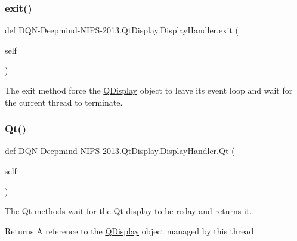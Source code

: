 \subsubsection{\texorpdfstring{exit()}{exit()}}
{\footnotesize\ttfamily def D\+QN-\/Deepmind-\/N\+I\+PS-\/2013.Qt\+Display.\+Display\+Handler.\+exit (\begin{DoxyParamCaption}\item[{}]{self }\end{DoxyParamCaption})}



The exit method force the \hyperlink{classDQN-Deepmind-NIPS-2013_1_1QtDisplay_1_1QDisplay}{Q\+Display} object to leave its event loop and wait for the current thread to terminate. 

\hypertarget{classDQN-Deepmind-NIPS-2013_1_1QtDisplay_1_1DisplayHandler_a1c18d34e62cbeff7c6d75a8eeb02506b}{}\label{classDQN-Deepmind-NIPS-2013_1_1QtDisplay_1_1DisplayHandler_a1c18d34e62cbeff7c6d75a8eeb02506b} 
\subsubsection{\texorpdfstring{Qt()}{Qt()}}
{\footnotesize\ttfamily def D\+QN-\/Deepmind-\/N\+I\+PS-\/2013.Qt\+Display.\+Display\+Handler.\+Qt (\begin{DoxyParamCaption}\item[{}]{self }\end{DoxyParamCaption})}



The Qt methods wait for the Qt display to be reday and returns it. 

\begin{DoxyReturn}{Returns}
A reference to the \hyperlink{classDQN-Deepmind-NIPS-2013_1_1QtDisplay_1_1QDisplay}{Q\+Display} object managed by this thread 
\end{DoxyReturn}
\hypertarget{classDQN-Deepmind-NIPS-2013_1_1QtDisplay_1_1DisplayHandler_a1f995b71cfad970a33d358737a90970a}{}\label{classDQN-Deepmind-NIPS-2013_1_1QtDisplay_1_1DisplayHandler_a1f995b71cfad970a33d358737a90970a} 
